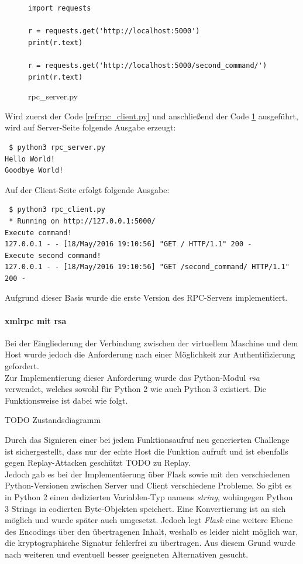 \begin{figure}
\begin{lstlisting}
import requests

r = requests.get('http://localhost:5000')
print(r.text)

r = requests.get('http://localhost:5000/second_command/')
print(r.text)
\end{lstlisting}
\label{ref:rpc_server.py}
\caption{rpc\_server.py}
\end{figure}

Wird zuerst der Code \ref{ref:rpc_client.py} und anschließend der Code \ref{ref:rpc_server.py} ausgeführt, wird auf Server-Seite folgende Ausgabe erzeugt:
\begin{lstlisting}
 $ python3 rpc_server.py
Hello World!
Goodbye World!
\end{lstlisting}
Auf der Client-Seite erfolgt folgende Ausgabe:
\begin{lstlisting}
 $ python3 rpc_client.py
 * Running on http://127.0.0.1:5000/
Execute command!
127.0.0.1 - - [18/May/2016 19:10:56] "GET / HTTP/1.1" 200 -
Execute second command!
127.0.0.1 - - [18/May/2016 19:10:56] "GET /second_command/ HTTP/1.1" 200 -
\end{lstlisting}

Aufgrund dieser Basis wurde die erste Version des RPC-Servers implementiert.

\paragraph{xmlrpc mit rsa}
Bei der Eingliederung der Verbindung zwischen der virtuellem Maschine und dem Host wurde jedoch die Anforderung nach einer Möglichkeit zur Authentifizierung gefordert.\\

Zur Implementierung dieser Anforderung wurde das Python-Modul \textit{rsa} verwendet, welches sowohl für Python 2 wie auch Python 3 existiert. Die Funktionsweise ist dabei wie folgt.

TODO Zustandsdiagramm

Durch das Signieren einer bei jedem Funktionsaufruf neu generierten Challenge ist sichergestellt, dass nur der echte Host die Funktion aufruft und ist ebenfalls gegen Replay-Attacken geschützt TODO zu Replay.\\

Jedoch gab es bei der Implementierung über Flask sowie mit den verschiedenen Python-Versionen zwischen Server und Client verschiedene Probleme. So gibt es in Python 2 einen dedizierten Variablen-Typ namens \textit{string}, wohingegen Python 3 Strings in codierten Byte-Objekten speichert. Eine Konvertierung ist an sich möglich und wurde später auch umgesetzt. Jedoch legt \textit{Flask} eine weitere Ebene des Encodings über den übertragenen Inhalt, weshalb es leider nicht möglich war, die kryptographische Signatur fehlerfrei zu übertragen. Aus diesem Grund wurde nach weiteren und eventuell besser geeigneten Alternativen gesucht.\\

